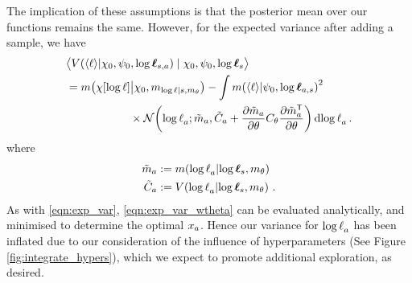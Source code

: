 \documentclass{article}
\begin{document}
The implication of these assumptions is that the posterior mean over our functions remains the same.
However, for the expected variance after adding a sample, we have
\begin{align}\label{eqn:exp_var_wtheta}
& \bigl\langle \cov{\inty{\lfn}}{\chi_0,\psi_0,\tvr_{s,a}}\mid \chi_0,\psi_0,\tvr_{s}\bigr\rangle
\nonumber\\
& =  \mean{\chi[\tr]}{\chi_0,m_{\tr|s,m_\theta}}  - 
\int\mean{\inty{\lfn}}{\psi_0,\tvr_{a,s}}^2
\nonumber\\
& \hspace{2cm}
\times\N{\tr_a}
{\tilde{m}_a }
{\tilde{C}_a +\pderiv{\tilde{m}_a}{\theta}C_\theta\pderiv{\tilde{m}\tra_a}{\theta}}
\ud\tr_a\,.
\end{align}
where
\begin{align*}
\tilde{m}_a & \deq \mean{\tr_a}{\tvr_s,m_\theta}\\
\tilde{C}_a & \deq \cov{\tr_a}{\tvr_s,m_\theta}\,.
\end{align*}
As with \eqref{eqn:exp_var}, \eqref{eqn:exp_var_wtheta} can be evaluated analytically, and minimised to determine the optimal $\lfv_a$.
Hence our variance for $\tr_a$ has been inflated due to our consideration of the influence of hyperparameters (See Figure \ref{fig:integrate_hypers}), which we expect to promote additional exploration, as desired.
\end{document}
